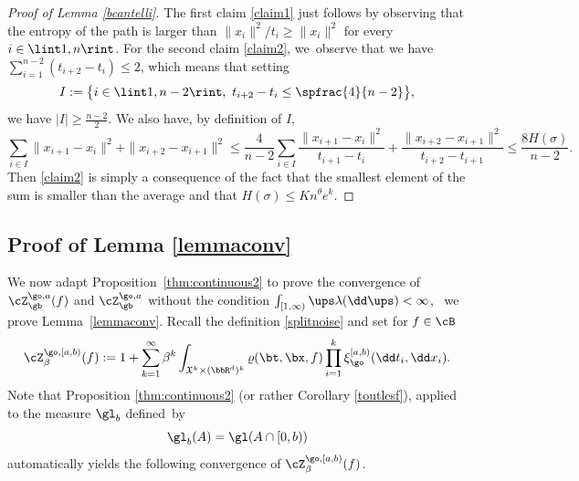 \begin{proof}[Proof of Lemma \ref{bcantelli}]
The first claim \eqref{claim1} just follows by observing that the entropy of the path is
larger than $\|x_i\|^2/t_i \ge \|x_i\|^2$ for every $i\in \lint 1, n\rint$.
For the second claim \eqref{claim2}, we~observe that
we have
$\sum_{i=1}^{n-2}(t_{i+2}-t_i)\le 2$,
which means that setting
\[
I:= \bigl\{ i\in \lint 1,n-2\rint, \ t_{i+2}-t_i\le \spfrac{4 }{n-2} \bigr\},
\]
we have $|I|\ge \frac{n-2}{2}$. We also have, by definition of $I$,
\begin{equation*}
\sum_{i\in I} \|x_{i+1}-x_i \|^2+\|x_{i+2}-x_{i+1}\|^2\le \frac{4 }{n-2}
\sum_{i\in I}\frac{\|x_{i+1}-x_i\|^2}{t_{i+1}-t_i}+\frac{\|x_{i+2}-x_{i+1}\|^2}{t_{i+2} -t_{i+1}}
\le \frac{8 H(\sigma) }{n-2}.
\end{equation*}
Then \eqref{claim2} is simply a consequence of the fact that
the smallest element of the sum is smaller than the average
and that $H(\sigma) \leq K n^{\theta} e^k$.
\end{proof}

\subsection{Proof of Lemma \ref{lemmaconv}}
\label{sec:lemmaconv}

We now adapt Proposition~\ref{thm:continuous2}
to prove the convergence of $\cZ_{\gb}^{\go,a}(f)$ and $\cZ_{\gb}^{\go,a}$
without the condition $\int_{[1,\infty)} \ups \lambda(\dd \ups) <\infty$, \ie ~we prove Lemma~\ref{lemmaconv}.
Recall the definition \eqref{splitnoise}
and set for $f\in \cB$
\begin{equation}\label{trunkaparti}
\cZ^{\go,[a,b)}_{\beta}(f):=1+\sum_{k=1}^\infty \beta^k\int_{ \mathfrak{X}^k \times (\bbR^d)^k} \varrho(\bt, \bx, f) \prod_{i=1}^k \xi^{[a,b)}_{\go} (\dd t_i, \dd x_i).
\end{equation}
Note that Proposition \ref{thm:continuous2} (or rather Corollary \ref{toutlesf}), applied to the measure $\gl_b$ defined~by
\begin{equation}\label{glbdef}
\gl_b(A)=\gl(A\cap[0,b))
\end{equation}
automatically yields the following convergence of $\cZ^{\go,[a,b)}_{\beta}(f)$.

